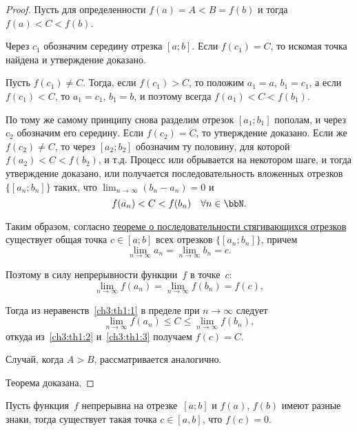 \begin{proof}
Пусть для определенности $f(a)=A < B = f(b)$ и тогда $f(a) < C < f(b)$.

Через $c_1$ обозначим середину отрезка $[a;b]$. Если $f(c_1) = C$, то искомая точка найдена и утверждение доказано.

Пусть $f(c_1)\ne C$. Тогда, если $f(c_1) > C$, то положим $a_1 = a$, $b_1 = c_1$, а если $f(c_1) < C$, то $a_1 = c_1$, $b_1 = b$, и поэтому всегда $f(a_1)<C<f(b_1)$.

По тому же самому принципу снова разделим отрезок $[a_1; b_1]$ пополам, и через $c_2$ обозначим его середину. Если $f(c_2) = C$, то утверждение доказано. Если же $f(c_2) \ne C$, то через $[a_2;b_2]$ обозначим ту половину, для которой $f(a_2) < C < f(b_2)$, и т.д. Процесс или обрывается на некотором шаге, и тогда утверждение доказано, или получается последовательность вложенных отрезков $\{[a_n;b_n]\}$ таких, что $\lim_{n \to \infty}\limits(b_n-a_n)=0$ и
\begin{equation}\label{ch3:th1:1}
f(a_n)<C<f(b_n)\quad \forall n\in \bbN.
\end{equation}

Таким образом, согласно  \hyperref[th:ch1:poslstyag]{теореме о последовательности стягивающихся отрезков} существует общая точка $c \in [a;b]$ всех отрезков $\{[a_n;b_n]\}$, причем 
$$
\lim_{n \to \infty}a_n = \lim_{n \to \infty}b_n = c.
$$

Поэтому в силу непрерывности функции~$f$ в точке~$c$:
\begin{equation}\label{ch3:th1:2}
\lim_{n \to \infty}f(a_n) = \lim_{n \to \infty}f(b_n) = f(c),
\end{equation}

Тогда из неравенств~\eqref{ch3:th1:1} в пределе при $n \to \infty$ следует 
\begin{equation}\label{ch3:th1:3}
\lim_{n \to \infty}f(a_n) \le C \le \lim_{n \to \infty}f(b_n),
\end{equation}
откуда из~\eqref{ch3:th1:2} и~\eqref{ch3:th1:3} получаем $f(c)=C$.

Случай, когда $A > B$, рассматривается аналогично.
 
Теорема доказана.
\end{proof}

\begin{cons}
Пусть функция~$f$ непрерывна на отрезке~$[a;b]$ и $f(a)$, $f(b)$ имеют разные знаки, тогда существует такая точка $c \in [a,b]$, что $f(c)=0$.
\end{cons}

